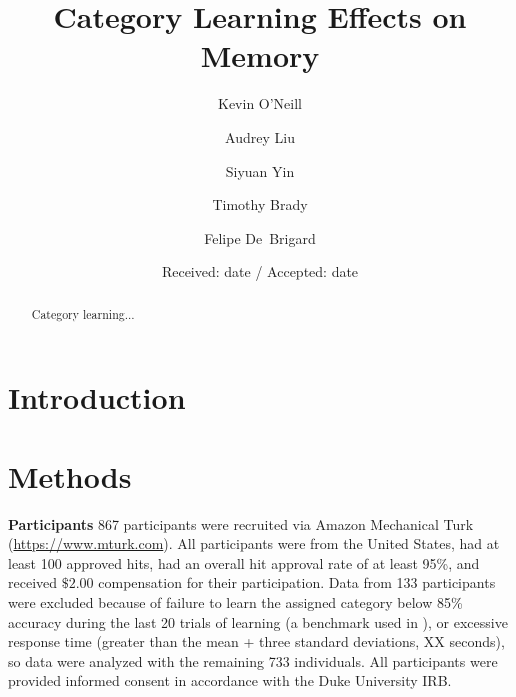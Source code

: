 \documentclass[twocolumn]{svjour3}          %
\begin{document}
\title{Category Learning Effects on Memory
}


\author{Kevin O'Neill \and Audrey Liu \and Siyuan Yin \and Timothy Brady \and Felipe De~Brigard}


\date{Received: date / Accepted: date}


\maketitle

\begin{abstract}
Category learning...
\end{abstract}

\section*{Introduction}
\label{intro}

\section*{Methods}
\label{methods}

\textbf{Participants }
867 participants were recruited via Amazon Mechanical Turk
(\url{https://www.mturk.com}). All participants were from the United
States, had at least 100 approved hits, had an overall hit approval
rate of at least 95\%, and received $\$2.00$ compensation for their
participation. Data from 133 participants were excluded because of
failure to learn the assigned category below 85\% accuracy during the
last 20 trials of learning (a benchmark used in \cite{DeBrigard2017}),
or excessive response time (greater than the mean + three standard
deviations, XX seconds), so data were analyzed with the remaining 733
individuals. All participants were provided informed consent in
accordance with the Duke University IRB.
\end{document}
